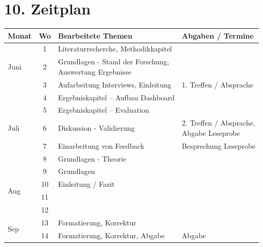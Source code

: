\section*{10. Zeitplan}
\begin{table}[h]
\begin{tabular}{|l|c|l|l|}
\hline
Monat                 & Wo & Bearbeitete Themen & Abgaben / Termine \\ \hline
\multirow{3}{*}{Juni} & 1  & Literaturrecherche, Methodikkapitel  &                   \\ \cline{2-4} 
                      & 2  & \makecell[l]{Grundlagen - Stand der Forschung,\\ Auswertung Ergebnisse} &                   \\ \cline{2-4} 
                      & 3  & Aufarbeitung Interviews, Einleitung & 1. Treffen / Absprache \\ \hline
\multirow{5}{*}{Juli} & 4  & Ergebniskapitel – Aufbau Dashboard &                   \\ \cline{2-4} 
                      & 5  & Ergebniskapitel – Evaluation &                   \\ \cline{2-4} 
                      & 6  & Diskussion - Validierung & \makecell[l]{2. Treffen / Absprache, \\ Abgabe Leseprobe} \\ \cline{2-4} 
                      & 7  & Einarbeitung von Feedback & Besprechung Leseprobe \\ \cline{2-4} 
                      & 8  & Grundlagen - Theorie &                   \\ \hline
\multirow{4}{*}{Aug}  & 9  & Grundlagen         &                   \\ \cline{2-4} 
                      & 10 & Einleitung / Fazit &                   \\ \cline{2-4} 
                      & 11 &                    &                   \\ \cline{2-4} 
                      & 12 &                    &                   \\ \hline
\multirow{2}{*}{Sep}  & 13 & Formatierung, Korrektur &                   \\ \cline{2-4} 
                      & 14 & Formatierung, Korrektur, Abgabe & Abgabe \\ \hline
\end{tabular}
\end{table}

